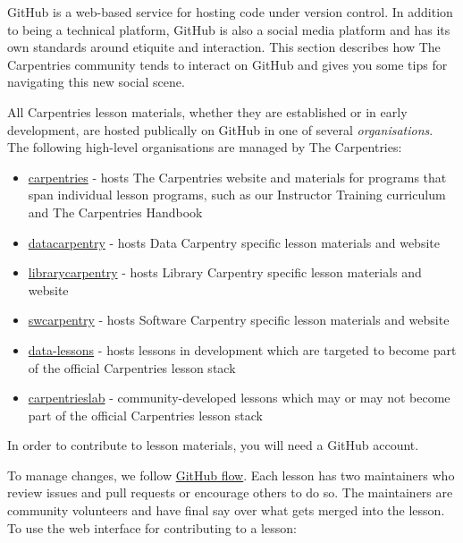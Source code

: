 \documentclass[]{book}
\providecommand{\tightlist}{%
  \setlength{\itemsep}{0pt}\setlength{\parskip}{0pt}}
\begin{document}
GitHub is a web-based service for hosting code under version control. In addition to being a technical
platform, GitHub is also a social media platform and has its own standards around etiquite and interaction. This
section describes how The Carpentries community tends to interact on GitHub and gives you some tips for
navigating this new social scene.

All Carpentries lesson materials, whether they are established or in early development, are hosted publically
on GitHub in one of several \emph{organisations}. The following high-level organisations are managed by The Carpentries:

\begin{itemize}
\tightlist
\item
  \href{https://github.com/carpentries}{carpentries} - hosts The Carpentries website and materials for programs that span individual lesson programs, such as our Instructor Training curriculum and The Carpentries Handbook
\item
  \href{https://github.com/datacarpentry}{datacarpentry} - hosts Data Carpentry specific lesson materials and website
\item
  \href{https://github.com/librarycarpentry}{librarycarpentry} - hosts Library Carpentry specific lesson materials and website
\item
  \href{https://github.com/swcarpentry}{swcarpentry} - hosts Software Carpentry specific lesson materials and website
\item
  \href{https://github.com/data-lessons}{data-lessons} - hosts lessons in development which are targeted to become part of the official Carpentries lesson stack
\item
  \href{http://github.com/carpentrieslab}{carpentrieslab} - community-developed lessons which may or may not become part of the official Carpentries lesson stack
\end{itemize}

In order to contribute to lesson materials, you will need a GitHub account.

To manage changes, we follow \href{https://guides.github.com/introduction/flow/}{GitHub flow}.
Each lesson has two maintainers who review issues and pull requests or encourage others to do so.
The maintainers are community volunteers and have final say over what gets merged into the lesson.
To use the web interface for contributing to a lesson:
\end{document}
